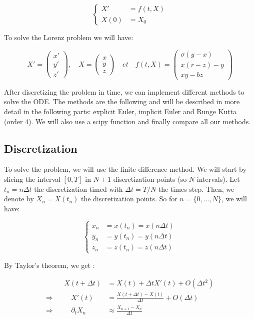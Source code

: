 \documentclass[12pt]{article}
\begin{document}
	$$\left\{\begin{aligned}
		X'&=f(t,X) \\
		X(0)&=X_0
	\end{aligned}\right.$$
	
	\noindent To solve the Lorenz problem we will have:
	
	$$X'=\begin{pmatrix}
		x' \\
		y' \\
		z'
	\end{pmatrix}, \quad X=\begin{pmatrix}
		x \\
		y \\
		z
	\end{pmatrix} \quad et \quad f(t,X)=\begin{pmatrix}
		\sigma(y-x) \\
		x(r-z)-y \\
		xy-bz
	\end{pmatrix}$$
	
	\noindent After discretizing the problem in time, we can implement different methods to solve the ODE. The methods are the following and will be described in more detail in the following parts: explicit Euler, implicit Euler and Runge Kutta (order 4). We will also use a scipy function and finally compare all our methods.
	
	\subsection{Discretization}
	
	To solve the problem, we will use the finite difference method. We will start by slicing the interval $[0,T]$ in $N+1$ discretization points (so $N$ intervals). Let $t_n=n\Delta t$ the discretization timed with $\Delta t=T/N$ the times step. Then, we denote by $X_n=X(t_n)$ the discretization points. So for $n=\{0,\dots,N\}$, we will have:
	
	$$\left\{\begin{aligned} 
		x_n&=x(t_n)=x(n\Delta t) \\
		y_n&=y(t_n)=y(n\Delta t) \\
		z_n&=z(t_n)=z(n\Delta t)
	\end{aligned}\right.$$
	
	\noindent By Taylor's theorem, we get :
	
	$$\begin{aligned}
		&&X(t+\Delta t)&=X(t)+\Delta t X'(t) + O(\Delta t^2) \\
		\Rightarrow&& \quad X'(t)&=\frac{X(t+\Delta t)-X(t)}{\Delta t} + O(\Delta t) \\
		\Rightarrow&& \quad \partial_t X_n&\approx\frac{X_{n+1}-X_n}{\Delta t} \\
	\end{aligned}
	$$	
	
\end{document}
